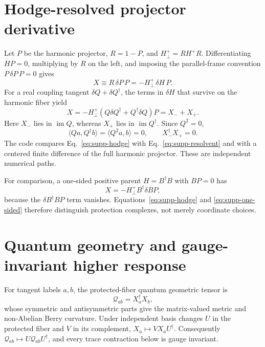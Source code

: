 \documentclass[aps,prl,onecolumn,superscriptaddress,longbibliography,floatfix]{revtex4-2}
\begin{document}
\section{Hodge-resolved projector derivative}
\label{sec:supp-response}

Let \(P\) be the harmonic projector, \(R=1-P\), and \(H_\perp^+=RH^+R\). Differentiating \(HP=0\), multiplying by \(R\) on the left, and imposing the parallel-frame convention \(P\,\delta P\,P=0\) gives
\begin{equation}
 X\equiv R\,\delta P\,P=-H_\perp^+\,\delta H\,P.
 \label{eq:supp-resolvent}
\end{equation}
For a real coupling tangent \(\delta Q+\delta Q^\dagger\), the terms in \(\delta H\) that survive on the harmonic fiber yield
\begin{equation}
 X=-H_\perp^+\left(Q\delta Q^\dagger+Q^\dagger\delta Q\right)P=X_-+X_+.
 \label{eq:supp-hodge}
\end{equation}
Here \(X_-\) lies in \(\operatorname{im}Q\), whereas \(X_+\) lies in \(\operatorname{im}Q^\dagger\). Since \(Q^2=0\),
\begin{equation}
 \langle Q a,Q^\dagger b\rangle=\langle Q^2a,b\rangle=0,
 \qquad X_-^\dagger X_+=0.
 \label{eq:supp-orthogonal}
\end{equation}
The code compares Eq.~\eqref{eq:supp-hodge} with Eq.~\eqref{eq:supp-resolvent} and with a centered finite difference of the full harmonic projector. These are independent numerical paths.

For comparison, a one-sided positive parent \(H=B^\dagger B\) with \(BP=0\) has
\begin{equation}
 X=-H_\perp^+B^\dagger\delta B P,
 \label{eq:supp-one-sided}
\end{equation}
because the \(\delta B^\dagger BP\) term vanishes. Equations~\eqref{eq:supp-hodge} and \eqref{eq:supp-one-sided} therefore distinguish protection complexes, not merely coordinate choices.

\section{Quantum geometry and gauge-invariant higher response}
\label{sec:supp-geometry}

For tangent labels \(a,b\), the protected-fiber quantum geometric tensor is
\begin{equation}
 \mathcal Q_{ab}=X_a^\dagger X_b,
 \label{eq:supp-qgt}
\end{equation}
whose symmetric and antisymmetric parts give the matrix-valued metric and non-Abelian Berry curvature. Under independent basis changes \(U\) in the protected fiber and \(V\) in its complement, \(X_a\mapsto VX_aU^\dagger\). Consequently \(\mathcal Q_{ab}\mapsto U\mathcal Q_{ab}U^\dagger\), and every trace contraction below is gauge invariant.
\end{document}
